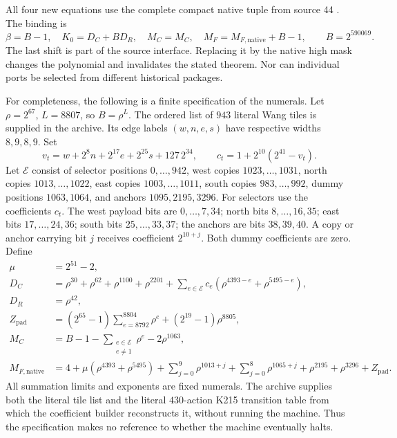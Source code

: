 \documentclass[11pt,a4paper]{article}
\theoremstyle{remark}
\begin{document}
All four new equations use the complete compact native tuple from source
44 \cite{source44}. The binding is
\[
 \beta=B-1,\quad K_0=D_C+BD_R,\quad M_C=M_C,\quad
 M_F=M_{F,\mathrm{native}}+B-1,
 \qquad B=2^{590069}.
\]
The last shift is part of the source interface. Replacing it by the native
high mask changes the polynomial and invalidates the stated theorem.
Nor can individual ports be selected from different historical packages.

For completeness, the following is a finite specification of the numerals.
Let $\rho=2^{67}$, $L=8807$, so $B=\rho^L$. The ordered list of $943$
literal Wang tiles is supplied in the archive. Its edge labels
$(w,n,e,s)$ have respective widths $8,9,8,9$. Set
\[
 v_t=w+2^8n+2^{17}e+2^{25}s+127\,2^{34},\qquad
 c_t=1+2^{10}(2^{41}-v_t).
\]
Let $\mathcal E$ consist of selector positions $0,\ldots,942$, west
copies $1023,\ldots,1031$, north copies $1013,\ldots,1022$, east copies
$1003,\ldots,1011$, south copies $983,\ldots,992$, dummy positions
$1063,1064$, and anchors $1095,2195,3296$.
For selectors use the coefficients $c_t$. The west payload bits are
$0,\ldots,7,34$; north bits $8,\ldots,16,35$; east bits
$17,\ldots,24,36$; south bits $25,\ldots,33,37$; the anchors are bits
$38,39,40$. A copy or anchor carrying bit $j$ receives coefficient
$2^{10+j}$. Both dummy coefficients are zero. Define
\begin{align*}
 \mu&=2^{51}-2,\\
 D_C&=\rho^{30}+\rho^{62}+\rho^{1100}+\rho^{2201}
       +\sum_{e\in\mathcal E}c_e
                  (\rho^{4393-e}+\rho^{5495-e}),\\
 D_R&=\rho^{42},\\
 Z_{\mathrm{pad}}&=(2^{65}-1)\sum_{e=8792}^{8804}\rho^e
                      +(2^{19}-1)\rho^{8805},\\
 M_C&=B-1-\sum_{\substack{e\in\mathcal E\\e\ne1}}\rho^e
                       -2\rho^{1063},\\
 M_{F,\mathrm{native}}&=4+\mu(\rho^{4393}+\rho^{5495})
       +\sum_{j=0}^{9}\rho^{1013+j}+\sum_{j=0}^{8}\rho^{1065+j}
       +\rho^{2195}+\rho^{3296}+Z_{\mathrm{pad}}.
\end{align*}
All summation limits and exponents are fixed numerals. The archive supplies
both the literal tile list and the literal $430$-action K215 transition
table from which the coefficient builder reconstructs it, without running
the machine. Thus the specification makes no reference to whether the
machine eventually halts.
\end{document}
